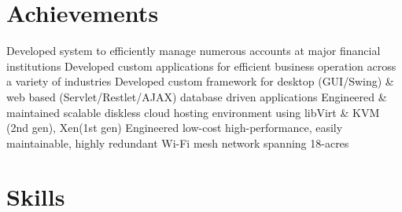 \documentclass[10pt]{report}
\title{}
\author{}
\date{}
\begin{document}
\setlength\parindent{0pt}

\section*{Achievements}
Developed system to efficiently manage numerous accounts at major financial institutions\newline
Developed custom applications for efficient business operation across a variety of industries\newline
Developed custom framework for desktop (GUI/Swing) \& web based (Servlet/Restlet/AJAX) database driven applications\newline
Engineered \& maintained scalable diskless cloud hosting environment using libVirt \& KVM (2nd gen), Xen(1st gen)\newline
Engineered low-cost high-performance, easily maintainable, highly redundant Wi-Fi mesh network spanning 18-acres

\section*{Skills}
\end{document}
